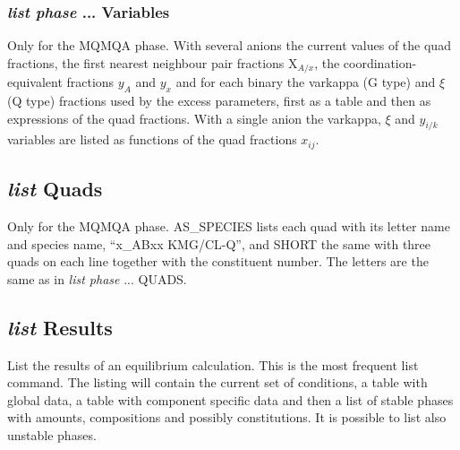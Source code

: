\documentclass[11pt]{article}
\begin{document}
\subsubsection{{\em list phase} ... Variables}

Only for the MQMQA phase.  With several anions the current values of
the quad fractions, the first nearest neighbour pair fractions X$_{A/x}$,
the coordination-equivalent fractions $y_A$ and $y_x$ and for each binary
the varkappa (G type) and $\xi$ (Q type) fractions used by the excess
parameters, first as a table and then as expressions of the quad
fractions.  With a single anion the varkappa, $\xi$ and $y_{i/k}$
variables are listed as functions of the quad fractions $x_{ij}$.

\hypertarget{List quads}{}
\subsection{{\em list} Quads}

Only for the MQMQA phase.  AS\_SPECIES lists each quad with its letter
name and species name, ``x\_ABxx KMG/CL-Q'', and SHORT the same with three
quads on each line together with the constituent number.  The letters
are the same as in {\em list phase} ... QUADS.

\hypertarget{List results}{}
\subsection{{\em list} Results}

List the results of an equilibrium calculation.  This is the most
frequent list command.  The listing will contain the current set of
conditions, a table with global data, a table with component specific
data and then a list of stable phases with amounts, compositions and
possibly constitutions.  It is possible to list also unstable phases.
\end{document}

